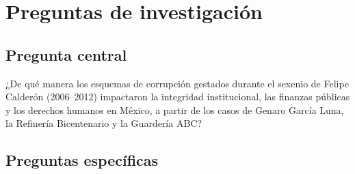 

\section{Preguntas de investigación}

\subsection{Pregunta central}

¿De qué manera los esquemas de corrupción gestados durante el sexenio de Felipe Calderón (2006--2012) impactaron la integridad institucional, las finanzas públicas y los derechos humanos en México, a partir de los casos de Genaro García Luna, la Refinería Bicentenario y la Guardería ABC?

\subsection{Preguntas específicas}

